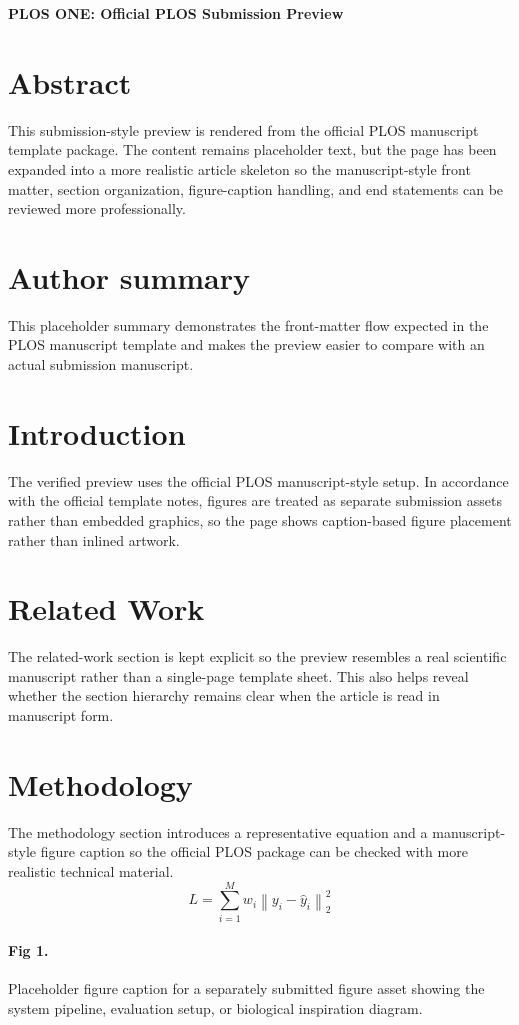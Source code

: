 \documentclass[10pt,letterpaper]{article}
\begin{document}
\begin{flushleft}
{\Large\bfseries PLOS ONE: Official PLOS Submission Preview}
\end{flushleft}
\section*{Abstract}
This submission-style preview is rendered from the official PLOS manuscript template package. The content remains placeholder text, but the page has been expanded into a more realistic article skeleton so the manuscript-style front matter, section organization, figure-caption handling, and end statements can be reviewed more professionally.
\section*{Author summary}
This placeholder summary demonstrates the front-matter flow expected in the PLOS manuscript template and makes the preview easier to compare with an actual submission manuscript.
\section{Introduction}
The verified preview uses the official PLOS manuscript-style setup. In accordance with the official template notes, figures are treated as separate submission assets rather than embedded graphics, so the page shows caption-based figure placement rather than inlined artwork.
\section{Related Work}
The related-work section is kept explicit so the preview resembles a real scientific manuscript rather than a single-page template sheet. This also helps reveal whether the section hierarchy remains clear when the article is read in manuscript form.
\section{Methodology}
The methodology section introduces a representative equation and a manuscript-style figure caption so the official PLOS package can be checked with more realistic technical material.
\begin{equation}
L = \sum_{i=1}^{M} w_i \left\| y_i - \hat{y}_i \right\|_2^2
\end{equation}
\paragraph{Fig 1.} Placeholder figure caption for a separately submitted figure asset showing the system pipeline, evaluation setup, or biological inspiration diagram.
\end{document}
